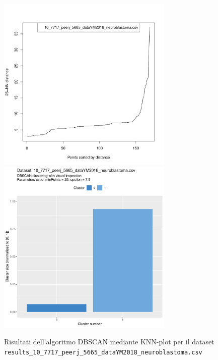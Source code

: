 \documentclass[12pt]{report}
\begin{document}
			\begin{figure}[h]
				\centering
				\includegraphics[width = 0.75\textwidth, height = 0.45\textheight, page = 3]{
					doc/DBSCAN_optimal_MinPts.pdf
				}
				\includegraphics[width = 0.75\textwidth, height = 0.45\textheight, page = 3]{
					results/DBSCAN_visual_comparison.pdf
				}
				\caption{Risultati dell'algoritmo DBSCAN mediante KNN-plot per il dataset
				\texttt{results\_10\_7717\_peerj\_5665\_dataYM2018\_neuroblastoma.csv}}
				\label{fig:dbscan-extra3}
			\end{figure}
\end{document}
